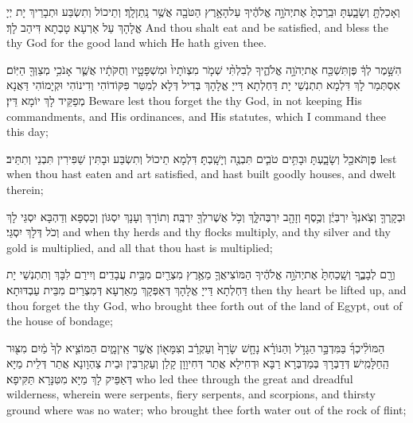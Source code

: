 {וְאָכַלְתָּ֖ וְשָׂבָ֑עְתָּ וּבֵֽרַכְתָּ֙ אֶת\maqqaf יְהֹוָ֣ה אֱלֹהֶ֔יךָ עַל\maqqaf הָאָ֥רֶץ הַטֹּבָ֖ה אֲשֶׁ֥ר נָֽתַן\maqqaf לָֽךְ׃}
{וְתֵיכוֹל וְתִשְׂבַּע וּתְבָרֵיךְ יָת יְיָ אֱלָהָךְ עַל אַרְעָא טָבְתָא דִּיהַב לָךְ׃}
{And thou shalt eat and be satisfied, and bless the \lord\space thy God for the good land which He hath given thee.}{}

{הִשָּׁ֣מֶר לְךָ֔ פֶּן\maqqaf תִּשְׁכַּ֖ח אֶת\maqqaf יְהֹוָ֣ה אֱלֹהֶ֑יךָ לְבִלְתִּ֨י שְׁמֹ֤ר מִצְוֺתָיו֙ וּמִשְׁפָּטָ֣יו וְחֻקֹּתָ֔יו אֲשֶׁ֛ר אָנֹכִ֥י מְצַוְּךָ֖ הַיּֽוֹם׃}
{אִסְתְּמַר לָךְ דִּלְמָא תִתְנְשֵׁי יָת דַּחְלְתָא דַּייָ אֱלָהָךְ בְּדִיל דְּלָא לְמִטַּר פִּקּוֹדוֹהִי וְדִינוֹהִי וּקְיָמוֹהִי דַּאֲנָא מְפַקֵּיד לָךְ יוֹמָא דֵּין׃}
{Beware lest thou forget the \lord\space thy God, in not keeping His commandments, and His ordinances, and His statutes, which I command thee this day;}{}

{פֶּן\maqqaf תֹּאכַ֖ל וְשָׂבָ֑עְתָּ וּבָתִּ֥ים טֹבִ֛ים תִּבְנֶ֖ה וְיָשָֽׁבְתָּ׃}
{דִּלְמָא תֵיכוֹל וְתִשְׂבַּע וּבָתִּין שַׁפִּירִין תִּבְנֵי וְתִתֵּיב׃}
{lest when thou hast eaten and art satisfied, and hast built goodly houses, and dwelt therein;}{}

{וּבְקָֽרְךָ֤ וְצֹֽאנְךָ֙ יִרְבְּיֻ֔ן וְכֶ֥סֶף וְזָהָ֖ב יִרְבֶּה\maqqaf לָּ֑ךְ וְכֹ֥ל אֲשֶׁר\maqqaf לְךָ֖ יִרְבֶּֽה׃}
{וְתוֹרָךְ וְעָנָךְ יִסְגּוֹן וְכַסְפָּא וְדַהְבָּא יִסְגֵּי לָךְ וְכֹל דְּלָךְ יִסְגֵּי׃}
{and when thy herds and thy flocks multiply, and thy silver and thy gold is multiplied, and all that thou hast is multiplied;}{}

{וְרָ֖ם לְבָבֶ֑ךָ וְשָֽׁכַחְתָּ֙ אֶת\maqqaf יְהֹוָ֣ה אֱלֹהֶ֔יךָ הַמּוֹצִיאֲךָ֛ מֵאֶ֥רֶץ מִצְרַ֖יִם מִבֵּ֥ית עֲבָדִֽים׃}
{וְיִירַם לִבָּךְ וְתִתְנְשֵׁי יָת דַּחְלְתָא דַּייָ אֱלָהָךְ דְּאַפְּקָךְ מֵאַרְעָא דְּמִצְרַיִם מִבֵּית עַבְדּוּתָא׃}
{then thy heart be lifted up, and thou forget the \lord\space thy God, who brought thee forth out of the land of Egypt, out of the house of bondage;}{}

{הַמּוֹלִ֨יכְךָ֜ בַּמִּדְבָּ֣ר \legarmeh  הַגָּדֹ֣ל וְהַנּוֹרָ֗א נָחָ֤שׁ \pasek  שָׂרָף֙ וְעַקְרָ֔ב וְצִמָּא֖וֹן אֲשֶׁ֣ר אֵֽין\maqqaf מָ֑יִם הַמּוֹצִ֤יא לְךָ֙ מַ֔יִם מִצּ֖וּר הַֽחַלָּמִֽישׁ׃}
{דְּדַבְּרָךְ בְּמַדְבְּרָא רַבָּא וּדְחִילָא אֲתַר דְּחִיוָוָן קָלַן וְעַקְרַבִּין וּבֵית צַהְוָונָא אֲתַר דְּלֵית מַיָּא דְּאַפֵּיק לָךְ מַיָּא מִטִּנָּרָא תַּקִּיפָא׃}
{who led thee through the great and dreadful wilderness, wherein were serpents, fiery serpents, and scorpions, and thirsty ground where was no water; who brought thee forth water out of the rock of flint;}{}

